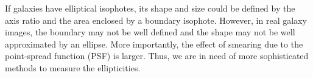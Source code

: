 \documentclass[twocolumn,useAMS,usenatbib]{mn2e}
\newcommand{\rachel}[1]{{\textcolor{red}{#1}}}
\newcommand{\arun}[1]{{\textcolor{blue}{#1}}}
\newcommand{\rmd}{\mathrm{d}}
\begin{document}
If galaxies have elliptical isophotes, its shape and size could be defined by the axis ratio and the area enclosed by a boundary isophote. However, in real galaxy images,
the boundary may not be well defined and the shape may not be well approximated by an ellipse. More importantly, the effect of smearing due to the point-spread function (PSF) is larger. 
Thus, we are in need of more sophisticated methods to measure the ellipticities.
% 
% 
\end{document}
